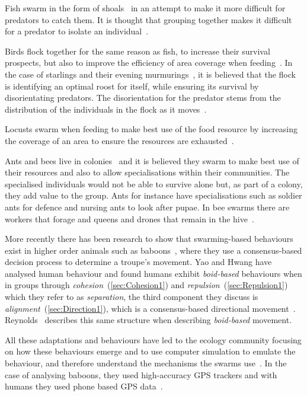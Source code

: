 Fish swarm in the form of shoals~\cite{PMRT:14} in an attempt to make it more difficult for predators to catch them. It is thought that grouping together makes it difficult for a predator to isolate an individual~\cite{MP:87}.

Birds flock together for the same reason as fish, to increase their survival prospects, but also to improve the efficiency of area coverage when feeding~\cite{PMRT:14}. In the case of starlings and their evening murmurings~\cite{YSCGL:12}, it is believed that the flock is identifying an optimal roost for itself, while ensuring its survival by disorientating predators. The disorientation for the predator stems from the distribution of the individuals in the flock as it moves~\cite{CCGP:10}.

Locusts swarm when feeding to make best use of the food resource by increasing the coverage of an area to ensure the resources are exhausted~\cite{GSSC:12, TDEB:12}.

Ants and bees live in colonies~\cite{MK:15, SVP:06} and it is believed they swarm to make best use of their resources and also to allow specialisations within their communities. The specialised individuals would not be able to survive alone but, as part of a colony, they add value to the group. Ants for instance have specialisations such as soldier ants for defence and nursing ants to look after pupae. In bee swarms there are workers that forage and queens and drones that remain in the hive~\cite{BBKA:ND}.

More recently there has been research to show that swarming-based behaviours exist in higher order animals such as baboons~\cite{SFDCIC:15}, where they use a consensus-based decision process to determine a troupe's movement. Yao and Hwang have analysed human behaviour and found humans exhibit \emph{boid-based} behaviours when in groups through \emph{cohesion}~(\autoref{sec:Cohesion1}) and \emph{repulsion}~(\autoref{sec:Repulsion1}) which they refer to as \emph{separation}, the third component they discuss is \emph{alignment}~(\autoref{sec:Direction1}), which is a consensus-based directional movement~\cite{YH:14}. Reynolds~\cite{REY:87} describes this same structure when describing \emph{boid-based} movement.

All these adaptations and behaviours have led to the ecology community focusing on how these behaviours emerge and to use computer simulation to emulate the behaviour, and therefore understand the mechanisms the swarms use~\cite{ENNT:10}. In the case of analysing baboons, they used high-accuracy GPS trackers and with humans they used phone based GPS data~\cite{SFDCIC:15}.

